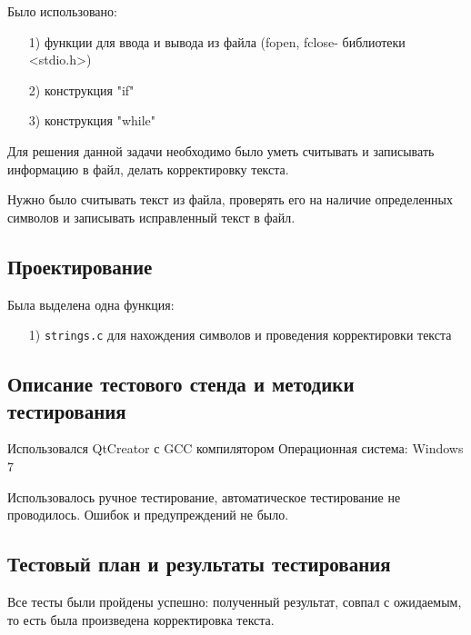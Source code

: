 \documentclass[12pt,a4paper]{report}
\begin{document}
Было использовано:
\begin{enumerate}
\item[1)] функции для ввода и вывода из файла (fopen, fclose- библиотеки <stdio.h>)
\item[2)] конструкция "if"
\item[3)] конструкция "while"
\end{enumerate}

Для решения данной задачи необходимо было уметь считывать и записывать информацию в файл, делать корректировку текста.

Нужно было считывать текст из файла, проверять его на наличие определенных символов и записывать исправленный текст в файл.

\subsection{Проектирование}

Была выделена одна функция:
\begin{enumerate}
\item[1)] \verb-strings.c- для нахождения символов и проведения корректировки текста
\end{enumerate}

\subsection{Описание тестового стенда и методики тестирования}
Использовался QtCreator с GCC компилятором
Операционная система: Windows 7


Использовалось ручное тестирование, автоматическое тестирование не проводилось.
Ошибок и предупреждений не было.

\subsection{Тестовый план и результаты тестирования}
Все тесты были пройдены успешно: полученный результат, совпал с ожидаемым, то есть была произведена корректировка текста.
\end{document}
